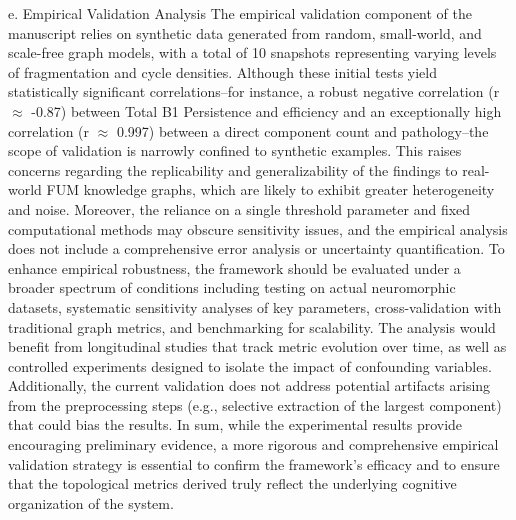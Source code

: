 \documentclass{article}
\begin{document}
e. Empirical Validation Analysis  
The empirical validation component of the manuscript relies on synthetic data generated from random, small-world, and scale-free graph models, with a total of 10 snapshots representing varying levels of fragmentation and cycle densities. Although these initial tests yield statistically significant correlations--for instance, a robust negative correlation (r $\approx$ -0.87) between Total B1 Persistence and efficiency and an exceptionally high correlation (r $\approx$ 0.997) between a direct component count and pathology--the scope of validation is narrowly confined to synthetic examples. This raises concerns regarding the replicability and generalizability of the findings to real-world FUM knowledge graphs, which are likely to exhibit greater heterogeneity and noise. Moreover, the reliance on a single threshold parameter and fixed computational methods may obscure sensitivity issues, and the empirical analysis does not include a comprehensive error analysis or uncertainty quantification. To enhance empirical robustness, the framework should be evaluated under a broader spectrum of conditions including testing on actual neuromorphic datasets, systematic sensitivity analyses of key parameters, cross-validation with traditional graph metrics, and benchmarking for scalability. The analysis would benefit from longitudinal studies that track metric evolution over time, as well as controlled experiments designed to isolate the impact of confounding variables. Additionally, the current validation does not address potential artifacts arising from the preprocessing steps (e.g., selective extraction of the largest component) that could bias the results. In sum, while the experimental results provide encouraging preliminary evidence, a more rigorous and comprehensive empirical validation strategy is essential to confirm the framework’s efficacy and to ensure that the topological metrics derived truly reflect the underlying cognitive organization of the system.
\end{document}
